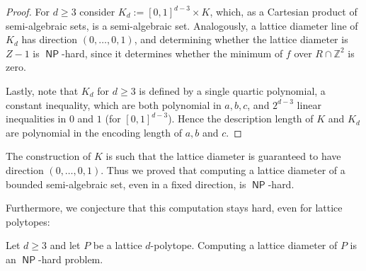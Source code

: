 \documentclass[11pt]{article}
\newcommand{\bp}{\mathbf{p}}
\newcommand{\Z}{\mathbb{Z}}
\DeclareMathOperator{\spn}{span}
\DeclareMathOperator{\NP}{\mathsf{NP}} %
\begin{document}
\begin{proof}
For $d \geq 3$ consider $K_d:=[0,1]^{d-3} \times K$, which, as a Cartesian product of semi-algebraic sets, is a semi-algebraic set. Analogously, a lattice diameter line of $K_d$ has direction $(0,\ldots,0,1)$, and determining whether the lattice diameter is $Z-1$ is $\NP$-hard, since it determines whether the minimum of $f$ over $R \cap \Z^2$ is zero.

Lastly, note that $K_d$ for $d \geq 3$ is defined by a single quartic polynomial, a constant inequality, which are both polynomial in $a,b,c$, and $2^{d-3}$ linear inequalities in $0$ and $1$ (for $[0,1]^{d-3}$). Hence the description length of $K$ and $K_d$ are polynomial in the encoding length of $a,b$ and $c$.
\end{proof}

\begin{remark}
    The construction of $K$ is such that the lattice diameter is guaranteed to have direction $(0, \ldots, 0,1)$. Thus we proved that computing a lattice diameter of a bounded semi-algebraic set, even in a fixed direction, is $\NP$-hard.
\end{remark}

Furthermore, we conjecture that this computation stays hard, even for lattice polytopes:

\begin{conjecture}
    Let $d \geq 3$ and let $P$ be a lattice $d$-polytope. Computing a lattice diameter of $P$ is an $\NP$-hard problem.
\end{conjecture}


    
\end{document}
